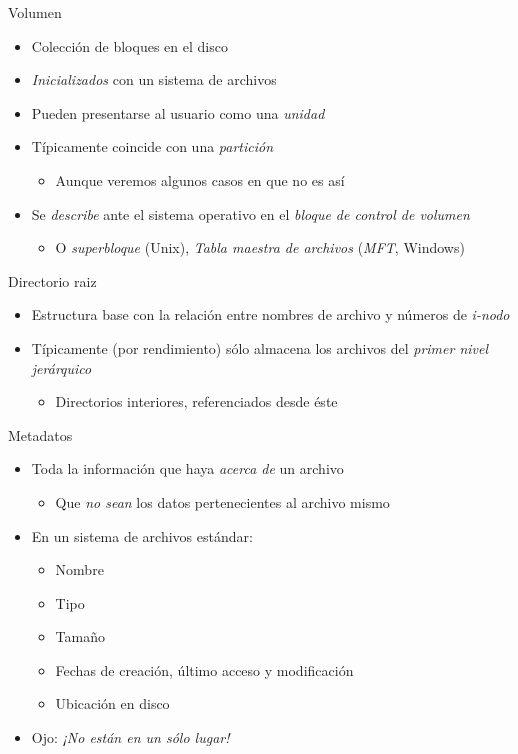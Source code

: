 \documentclass[presentation]{beamer}
\begin{document}
\begin{frame}[label={sec:org0f359eb}]{Volumen}
\begin{itemize}
\item Colección de bloques en el disco
\item \emph{Inicializados} con un sistema de archivos
\item Pueden presentarse al usuario como una \emph{unidad}
\item Típicamente coincide con una \emph{partición}
\begin{itemize}
\item Aunque veremos algunos casos en que no es así
\end{itemize}
\item Se \emph{describe} ante el sistema operativo en el \emph{bloque de control de volumen}
\begin{itemize}
\item O \emph{superbloque} (Unix), \emph{Tabla maestra de archivos} (\emph{MFT}, Windows)
\end{itemize}
\end{itemize}
\end{frame}

\begin{frame}[label={sec:org71a6946}]{Directorio raiz}
\begin{itemize}
\item Estructura base con la relación entre nombres de archivo y números
de \emph{i-nodo}
\item Típicamente (por rendimiento) sólo almacena los archivos del
\emph{primer nivel jerárquico}
\begin{itemize}
\item Directorios interiores, referenciados desde éste
\end{itemize}
\end{itemize}
\end{frame}

\begin{frame}[label={sec:org333db3b}]{Metadatos}
\begin{itemize}
\item Toda la información que haya \emph{acerca de} un archivo
\begin{itemize}
\item Que \emph{no sean} los datos pertenecientes al archivo mismo
\end{itemize}
\item En un sistema de archivos estándar:
\begin{itemize}
\item Nombre
\item Tipo
\item Tamaño
\item Fechas de creación, último acceso y modificación
\item Ubicación en disco
\end{itemize}
\item Ojo: \emph{¡No están en un sólo lugar!}
\end{itemize}
\end{frame}
\end{document}
